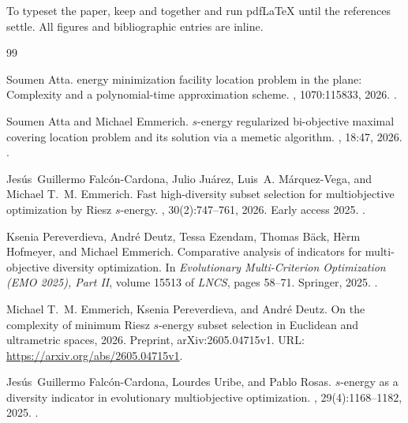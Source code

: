 \documentclass[a4paper,12pt]{article}
\numberwithin{equation}{section}
\begin{document}
To typeset the paper, keep  and  together and
run pdf\LaTeX{} until the references settle. All figures and bibliographic entries are inline.

\clearpage
{}

\begin{thebibliography}{99}

Soumen Atta.
 energy minimization facility location problem in the plane:
  Complexity and a polynomial-time approximation scheme.
, 1070:115833, 2026.
\newblock \href {https://doi.org/10.1016/j.tcs.2026.115833}
  {}.

Soumen Atta and Michael Emmerich.
 {$s$}-energy regularized bi-objective maximal covering
  location problem and its solution via a memetic algorithm.
, 18:47, 2026.
\newblock \href {https://doi.org/10.1007/s12293-026-00531-4}
  {}.

Jes{\'u}s~Guillermo Falc{\'o}n-Cardona, Julio Ju{\'a}rez, Luis~A.
  M{\'a}rquez-Vega, and Michael T.~M. Emmerich.
\newblock Fast high-diversity subset selection for multiobjective optimization
  by {Riesz} {$s$}-energy.
, 30(2):747--761,
  2026.
\newblock Early access 2025.
\newblock \href {https://doi.org/10.1109/TEVC.2025.3570938}
  {}.

Ksenia Pereverdieva, Andr{\'e} Deutz, Tessa Ezendam, Thomas B{\"a}ck, H{\`e}rm
  Hofmeyer, and Michael Emmerich.
\newblock Comparative analysis of indicators for multi-objective diversity
  optimization.
\newblock In {\em Evolutionary Multi-Criterion Optimization ({EMO} 2025), Part
  II}, volume 15513 of {\em LNCS}, pages 58--71. Springer, 2025.
\newblock \href {https://doi.org/10.1007/978-981-96-3538-2_5}
  {}.

Michael T.~M. Emmerich, Ksenia Pereverdieva, and Andr{\'e} Deutz.
\newblock On the complexity of minimum {Riesz} {$s$}-energy subset selection in
  {Euclidean} and ultrametric spaces, 2026.
\newblock Preprint, arXiv:2605.04715v1.
\newblock URL: \url{https://arxiv.org/abs/2605.04715v1}.

Jes{\'u}s~Guillermo Falc{\'o}n-Cardona, Lourdes Uribe, and Pablo Rosas.
 {$s$}-energy as a diversity indicator in evolutionary multiobjective optimization.
, 29(4):1168--1182, 2025.
\newblock \href{https://doi.org/10.1109/TEVC.2024.3405197}{}.


\end{thebibliography}
\end{document}
